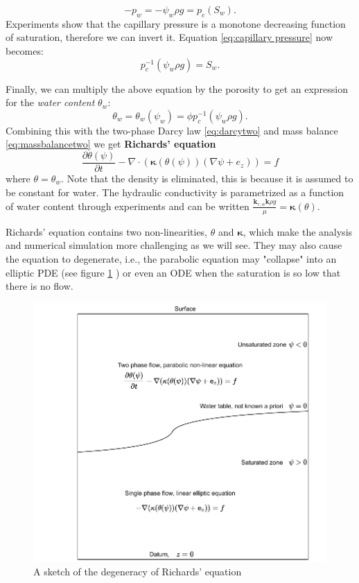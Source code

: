 \documentclass[../Main/main.tex]{subfiles}
\begin{document}
\begin{equation*}\label{eq:groundwater capillary pressure}
	-p_w = -\psi_w\rho g = p_c(S_w).
\end{equation*}
Experiments show that the capillary pressure is a monotone decreasing function of saturation, therefore we can invert it. Equation \eqref{eq:capillary pressure} now becomes:
\begin{equation*}
	p_c^{-1}(\psi_w\rho g) = S_w.
\end{equation*}

Finally, we can multiply the above equation by the porosity to get an expression for the \emph{water content} $\theta_w$:
\begin{equation*}
	\theta_w = \theta_w(\psi_w) = \phi p_c^{-1}(\psi_w\rho g).
\end{equation*}  
Combining this with the two-phase Darcy law \eqref{eq:darcytwo} and mass balance \eqref{eq:massbalancetwo} we get \textbf{Richards' equation}
\begin{equation}\label{eq:richards}
	\frac{\partial \theta(\psi)}{\partial t} - \nabla \cdot (\bm{\kappa} (\theta (\psi))(\nabla \psi + e_z)) = f
\end{equation}
where $\theta = \theta_w$. Note that the density is eliminated, this is because it is assumed to be constant for water. The hydraulic conductivity is parametrized as a function of water content through experiments and can be written  $\frac{\bm{k}_{r,\alpha}\bm{k}\rho g}{\mu} = \bm{\kappa}(\theta)$. \par 
Richards' equation contains two non-linearities, $\theta$ and $\bm{\kappa}$, which make the analysis and numerical simulation more challenging as we will see. They may also cause the equation to degenerate, i.e., the parabolic equation may "collapse" into an elliptic PDE (see figure \ref{fig:richards} ) or even an ODE when the saturation is so low that there is no flow.
\begin{figure}[h]
	\centering
	\includegraphics[width=\textwidth]{Richards.pdf}
	\caption{A sketch of the degeneracy of Richards' equation}
	\label{fig:richards}
\end{figure}
 
\end{document}
